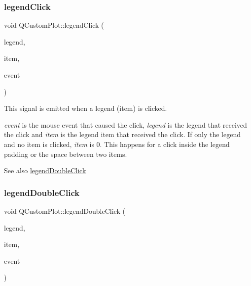 \subsubsection{\texorpdfstring{legendClick}{legendClick}}
{\footnotesize\ttfamily void Q\+Custom\+Plot\+::legend\+Click (\begin{DoxyParamCaption}\item[{\mbox{\hyperlink{class_q_c_p_legend}{Q\+C\+P\+Legend}} $\ast$}]{legend,  }\item[{\mbox{\hyperlink{class_q_c_p_abstract_legend_item}{Q\+C\+P\+Abstract\+Legend\+Item}} $\ast$}]{item,  }\item[{Q\+Mouse\+Event $\ast$}]{event }\end{DoxyParamCaption})\hspace{0.3cm}{\ttfamily [signal]}}

This signal is emitted when a legend (item) is clicked.

{\itshape event} is the mouse event that caused the click, {\itshape legend} is the legend that received the click and {\itshape item} is the legend item that received the click. If only the legend and no item is clicked, {\itshape item} is 0. This happens for a click inside the legend padding or the space between two items.

\begin{DoxySeeAlso}{See also}
\mbox{\hyperlink{class_q_custom_plot_a0250f835c044521df1619b132288bca7}{legend\+Double\+Click}} 
\end{DoxySeeAlso}
\mbox{\label{class_q_custom_plot_a0250f835c044521df1619b132288bca7}} 
\subsubsection{\texorpdfstring{legendDoubleClick}{legendDoubleClick}}
{\footnotesize\ttfamily void Q\+Custom\+Plot\+::legend\+Double\+Click (\begin{DoxyParamCaption}\item[{\mbox{\hyperlink{class_q_c_p_legend}{Q\+C\+P\+Legend}} $\ast$}]{legend,  }\item[{\mbox{\hyperlink{class_q_c_p_abstract_legend_item}{Q\+C\+P\+Abstract\+Legend\+Item}} $\ast$}]{item,  }\item[{Q\+Mouse\+Event $\ast$}]{event }\end{DoxyParamCaption})\hspace{0.3cm}{\ttfamily [signal]}}

